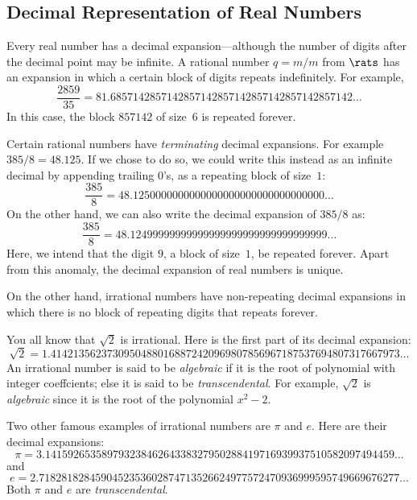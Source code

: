 \subsection{Decimal Representation of Real Numbers}

Every real number has a decimal expansion---although the
number of digits after the decimal point may be infinite.
A rational number $q=m/m$ from $\rats$ has an expansion
in which a certain block of digits repeats indefinitely.
For example, \[
\frac{2859}{35} = 81.6857142857142857142857142857142857142857142\dots
\]
In this case, the block $857142$ of size~$6$ is repeated forever.

Certain rational numbers have \textit{terminating} decimal expansions.
For example $385/8= 48.125$.  If we chose to do so, we could
write this instead as an infinite decimal by appending trailing $0$'s,
as a repeating block of size~$1$:
\[
\frac{385}{8} = 48.1250000000000000000000000000000000\dots
\]
On the other hand, we can also write the decimal expansion of
$385/8$ as:
\[
\frac{385}{8} = 48.12499999999999999999999999999999999\dots
\]
Here, we intend that the digit $9$, a block of size~$1$, be repeated forever.
Apart from this anomaly, the decimal expansion of real numbers is unique.

On the other hand, irrational numbers have non-repeating decimal 
expansions in which there is no block of repeating digits that
repeats forever.

You all know that $\sqrt{2}$ is irrational.  Here is the first part 
of its decimal expansion:
\[
\sqrt{2} =1.41421356237309504880168872420969807856967187537694807317667973\dots
\]
An irrational
number is said to be \textit{algebraic} if it is the root of
polynomial with integer coeffcients; else it is said to be
\textit{transcendental}.   
For example, $\sqrt{2}$ is \textit{algebraic} since it is the
root of the polynomial $x^2-2$.

Two other famous examples of irrational numbers are $\pi$ and $e$.
Here are their decimal expansions:
\[
\pi =3.14159265358979323846264338327950288419716939937510582097494459\dots
\]
and 
\[
e=2.7182818284590452353602874713526624977572470936999595749669676277\dots
\]
Both $\pi$ and $e$ are \textit{transcendental}.

